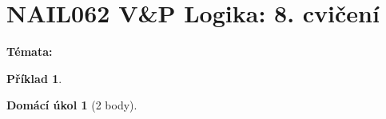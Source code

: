 \documentclass[a4paper]{article}
\theoremstyle{definition}
\newtheorem{problem}{Příklad}
\newtheorem*{ukol}{Domácí úkol}
\begin{document}
\section*{NAIL062 V\&P Logika: 8. cvičení}


\textbf{Témata:}



\medskip\begin{problem}
 
\end{problem}


\medskip\begin{ukol}[2 body]

\end{ukol}
\end{document}
